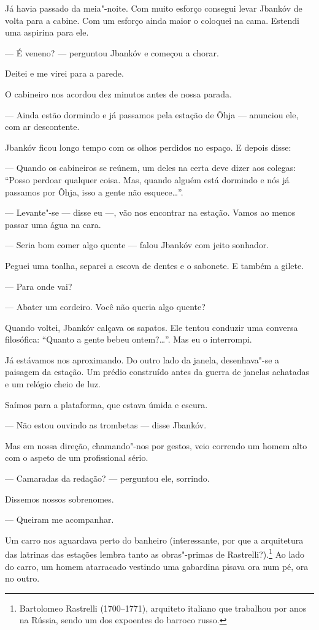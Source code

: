 Já havia passado da meia"-noite. Com muito esforço consegui levar Jbankóv
de volta para a cabine. Com um esforço ainda maior o coloquei na cama.
Estendi uma aspirina para ele.

--- É veneno? --- perguntou Jbankóv e começou a chorar.

Deitei e me virei para a parede.

O cabineiro nos acordou dez minutos antes de nossa parada.

--- Ainda estão dormindo e já passamos pela estação de Õhja
--- anunciou ele, com ar descontente.

Jbankóv ficou longo tempo com os olhos perdidos no espaço. E depois
disse:

--- Quando os cabineiros se reúnem, um deles na certa deve dizer
aos colegas: ``Posso perdoar qualquer coisa. Mas, quando alguém está
dormindo e nós já passamos por Õhja, isso a gente não esquece\ldots{}''.

--- Levante"-se --- disse eu ---, vão nos encontrar
na estação. Vamos ao menos passar uma água na cara.

--- Seria bom comer algo quente --- falou Jbankóv com
jeito sonhador.

Peguei uma toalha, separei a escova de dentes e o sabonete. E também a
gilete.

--- Para onde vai?

--- Abater um cordeiro. Você não queria algo quente?

Quando voltei, Jbankóv calçava os sapatos. Ele tentou conduzir uma
conversa filosófica: ``Quanto a gente bebeu ontem?\ldots{}''. Mas eu o
interrompi.

Já estávamos nos aproximando. Do outro lado da janela, desenhava"-se a
paisagem da estação. Um prédio construído antes da guerra de janelas
achatadas e um relógio cheio de luz.

Saímos para a plataforma, que estava úmida e escura.

--- Não estou ouvindo as trombetas --- disse Jbankóv.

Mas em nossa direção, chamando"-nos por gestos, veio correndo um homem
alto com o aspeto de um profissional sério. %

--- Camaradas da redação? --- perguntou ele, sorrindo.

Dissemos nossos sobrenomes.

--- Queiram me acompanhar.

Um carro nos aguardava perto do banheiro (interessante, por que a
arquitetura das latrinas das estações lembra tanto as obras"-primas de
Rastrelli?).\footnote{Bartolomeo Rastrelli (1700--1771), arquiteto
  italiano que trabalhou por anos na Rússia, sendo um dos expoentes do
  barroco russo.} Ao lado do carro, um homem atarracado vestindo uma
gabardina pisava ora num pé, ora no outro.


